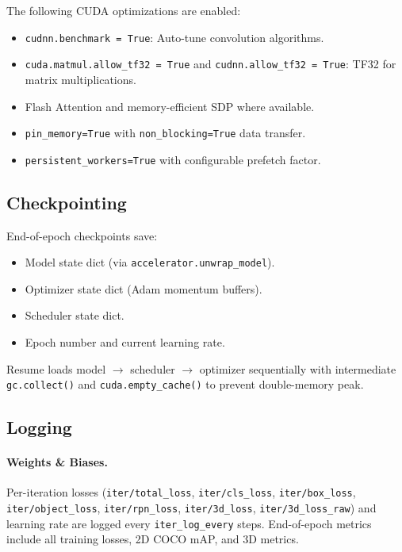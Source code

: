 \documentclass[runningheads]{llncs}
\begin{document}
The following CUDA optimizations are enabled:
\begin{itemize}
    \item \texttt{cudnn.benchmark = True}: Auto-tune convolution algorithms.
    \item \texttt{cuda.matmul.allow\_tf32 = True} and \texttt{cudnn.allow\_tf32 = True}: TF32 for matrix multiplications.
    \item Flash Attention and memory-efficient SDP where available.
    \item \texttt{pin\_memory=True} with \texttt{non\_blocking=True} data transfer.
    \item \texttt{persistent\_workers=True} with configurable prefetch factor.
\end{itemize}

\subsection{Checkpointing}

End-of-epoch checkpoints save:
\begin{itemize}
    \item Model state dict (via \texttt{accelerator.unwrap\_model}).
    \item Optimizer state dict (Adam momentum buffers).
    \item Scheduler state dict.
    \item Epoch number and current learning rate.
\end{itemize}

Resume loads model $\to$ scheduler $\to$ optimizer sequentially with intermediate \texttt{gc.collect()} and \texttt{cuda.empty\_cache()} to prevent double-memory peak.

\subsection{Logging}

\paragraph{Weights \& Biases.}  Per-iteration losses (\texttt{iter/total\_loss}, \texttt{iter/cls\_loss}, \texttt{iter/box\_loss}, \texttt{iter/object\_loss}, \texttt{iter/rpn\_loss}, \texttt{iter/3d\_loss}, \texttt{iter/3d\_loss\_raw}) and learning rate are logged every \texttt{iter\_log\_every} steps.  End-of-epoch metrics include all training losses, 2D COCO mAP, and 3D metrics.
\end{document}
